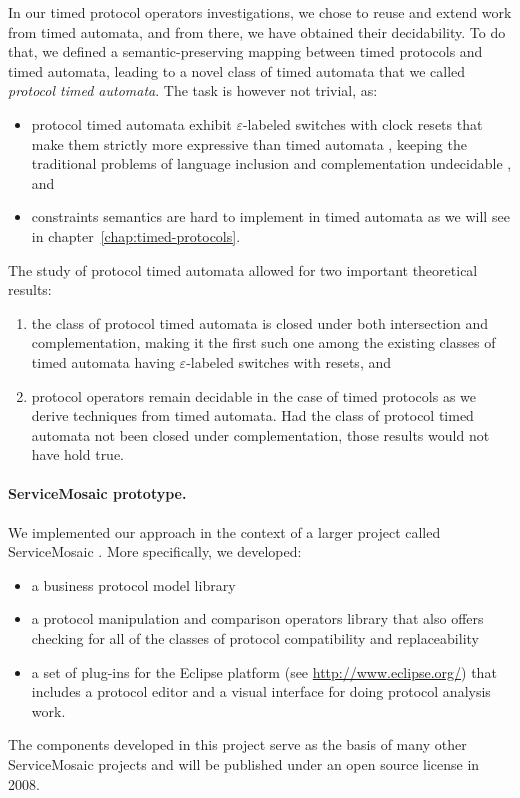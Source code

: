 In our timed protocol operators investigations, we chose to reuse and extend work from timed automata, and from there, we have obtained their decidability. To do that, we defined a semantic-preserving mapping between timed protocols and timed automata, leading to a novel class of timed automata that we called \emph{protocol timed automata}. The task is however not trivial, as:
\begin{itemize}
	
	\item protocol timed automata exhibit $\varepsilon$-labeled switches with clock resets that make them strictly more expressive than timed automata \cite{BBVD+99}, keeping the traditional problems of language inclusion and complementation undecidable \cite{RADLD94}, and
	
	\item \MInvoke constraints semantics are hard to implement in timed automata as we will see in chapter~\ref{chap:timed-protocols}.
	
\end{itemize}
The study of protocol timed automata allowed for two important theoretical results:
\begin{enumerate}
  
  \item the class of protocol timed automata is closed under both intersection and complementation, making it the first such one among the existing classes of timed automata having $\varepsilon$-labeled switches with resets, and
  
  \item protocol operators remain decidable in the case of timed protocols as we derive techniques from timed automata. Had the class of protocol timed automata not been closed under complementation, those results would not have hold true.
  
\end{enumerate}

\paragraph{ServiceMosaic prototype.}
We implemented our approach in the context of a larger project called ServiceMosaic \cite{NezhadSBCPT07}. More specifically, we developed:
\begin{itemize}

	\item a business protocol model library
	
	\item a protocol manipulation and comparison operators library that also offers checking for all of the classes of protocol compatibility and replaceability
	
	\item a set of plug-ins for the Eclipse platform (see \url{http://www.eclipse.org/}) that includes a protocol editor and a visual interface for doing protocol analysis work.

\end{itemize}
The components developed in this project serve as the basis of many other ServiceMosaic projects and will be published under an open source license in 2008.\\

